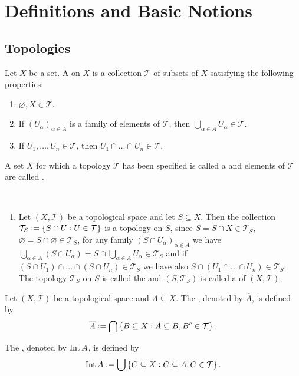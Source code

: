 \section{Definitions and Basic Notions}
\subsection{Topologies}

\begin{definition}
	Let $X$ be a set. A  on $X$ is a collection $\mathcal{T}$ of subsets of $X$ satisfying the following properties:
	\begin{enumerate}
		\item $\varnothing, X \in \mathcal{T}$.
		\item If $(U_\alpha)_{\alpha \in A}$ is a family of elements of $\mathcal{T}$, then $\bigcup_{\alpha \in A} U_\alpha \in \mathcal{T}$.
		\item If $U_1,\dots,U_n \in \mathcal{T}$, then $U_1 \cap \dots \cap U_n \in \mathcal{T}$.
	\end{enumerate}

	A set $X$ for which a topology $\mathcal{T}$ has been specified is called a  and elements of $\mathcal{T}$ are called . 
\end{definition}

\begin{example}[Topologies]
	~
	\begin{enumerate}[label = \textup{(}\alph*\textup{)}]
		\item Let $(X,\mathcal{T})$ be a topological space and let $S \subseteq X$. Then the collection $\mathcal{T}_S := \cbr[0]{S \cap U : U \in \mathcal{T}}$ is a topology on $S$, since $S = S \cap X \in \mathcal{T}_S$, $\varnothing = S \cap \varnothing \in \mathcal{T}_S$, for any family $(S \cap U_\alpha)_{\alpha \in A}$ we have $\bigcup_{\alpha \in A}(S \cap U_\alpha) = S \cap \bigcup_{\alpha \in A} U_\alpha \in \mathcal{T}_S$ and if $(S \cap U_1) \cap \dots \cap (S \cap U_n) \in \mathcal{T}_S$ we have also $S \cap (U_1 \cap \dots \cap U_n) \in \mathcal{T}_S$. The topology $\mathcal{T}_S$ on $S$ is called the  and $(S,\mathcal{T}_S)$ is called a  of $(X,\mathcal{T})$.
	\end{enumerate}
\end{example}

\begin{definition}
	Let $(X,\mathcal{T})$ be a topological space and $A \subseteq X$. The , denoted by $\overline{A}$, is defined by 
	\begin{equation}
		\overline{A} := \bigcap\cbr[0]{B \subseteq X : A \subseteq B, B^c \in \mathcal{T}}.
	\end{equation}

	The , denoted by $\operatorname{Int} A$, is defined by 
	\begin{equation}
		\Int A := \bigcup\cbr[0]{C \subseteq X: C \subseteq A, C \in \mathcal{T}}.	
	\end{equation}
\end{definition}

